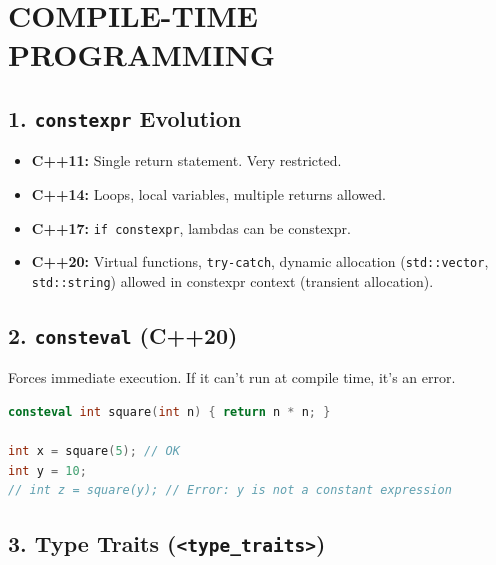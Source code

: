 \hypertarget{compile-time-programming}{%
\chapter{COMPILE-TIME PROGRAMMING}\label{compile-time-programming}}

\hypertarget{constexpr-evolution}{%
\section{\texorpdfstring{1. \texttt{constexpr}
Evolution}{1. constexpr Evolution}}\label{constexpr-evolution}}

\begin{itemize}
\tightlist
\item
  \textbf{C++11:} Single return statement. Very restricted.
\item
  \textbf{C++14:} Loops, local variables, multiple returns allowed.
\item
  \textbf{C++17:} \passthrough{\lstinline!if constexpr!}, lambdas can be
  constexpr.
\item
  \textbf{C++20:} Virtual functions,
  \passthrough{\lstinline!try-catch!}, dynamic allocation
  (\passthrough{\lstinline!std::vector!},
  \passthrough{\lstinline!std::string!}) allowed in constexpr context
  (transient allocation).
\end{itemize}

\hypertarget{consteval-c20}{%
\section{\texorpdfstring{2. \texttt{consteval}
(C++20)}{2. consteval (C++20)}}\label{consteval-c20}}

Forces immediate execution. If it can't run at compile time, it's an
error.

\begin{lstlisting}[language={C++}]
consteval int square(int n) { return n * n; }

int x = square(5); // OK
int y = 10;
// int z = square(y); // Error: y is not a constant expression
\end{lstlisting}

\hypertarget{type-traits-type_traits}{%
\section{\texorpdfstring{3. Type Traits
(\texttt{\textless{}type\_traits\textgreater{}})}{3. Type Traits (\textless type\_traits\textgreater)}}\label{type-traits-type_traits}}

